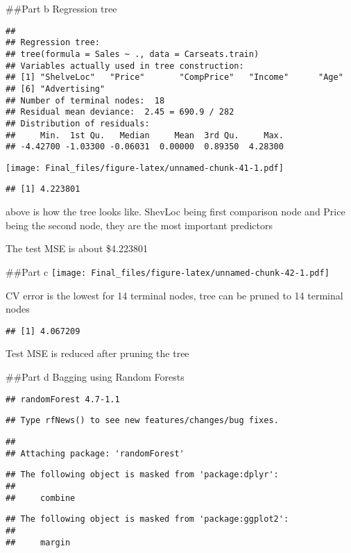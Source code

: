 \documentclass[
]{article}
\begin{document}
\#\#Part b Regression tree

\begin{verbatim}
## 
## Regression tree:
## tree(formula = Sales ~ ., data = Carseats.train)
## Variables actually used in tree construction:
## [1] "ShelveLoc"   "Price"       "CompPrice"   "Income"      "Age"        
## [6] "Advertising"
## Number of terminal nodes:  18 
## Residual mean deviance:  2.45 = 690.9 / 282 
## Distribution of residuals:
##     Min.  1st Qu.   Median     Mean  3rd Qu.     Max. 
## -4.42700 -1.03300 -0.06031  0.00000  0.89350  4.28300
\end{verbatim}

\texttt{[image: Final\_files/figure-latex/unnamed-chunk-41-1.pdf]}

\begin{verbatim}
## [1] 4.223801
\end{verbatim}

above is how the tree looks like. ShevLoc being first comparison node
and Price being the second node, they are the most important predictors

The test MSE is about \$4.223801

\#\#Part c
\texttt{[image: Final\_files/figure-latex/unnamed-chunk-42-1.pdf]}

CV error is the lowest for 14 terminal nodes, tree can be pruned to 14
terminal nodes

\begin{verbatim}
## [1] 4.067209
\end{verbatim}

Test MSE is reduced after pruning the tree

\#\#Part d Bagging using Random Forests

\begin{verbatim}
## randomForest 4.7-1.1
\end{verbatim}

\begin{verbatim}
## Type rfNews() to see new features/changes/bug fixes.
\end{verbatim}

\begin{verbatim}
## 
## Attaching package: 'randomForest'
\end{verbatim}

\begin{verbatim}
## The following object is masked from 'package:dplyr':
## 
##     combine
\end{verbatim}

\begin{verbatim}
## The following object is masked from 'package:ggplot2':
## 
##     margin
\end{verbatim}
\end{document}

